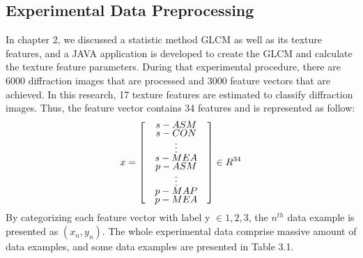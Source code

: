 \subsection{Experimental Data Preprocessing}
In chapter 2, we discussed a statistic method GLCM as well as its texture features, and a JAVA application is developed to create the GLCM and calculate the texture feature parameters. During that experimental procedure, there are 6000 diffraction images that are processed and 3000 feature vectors that are achieved. In this research, 17 texture features are estimated to classify diffraction images. Thus, the feature vector contains 34 features and is represented as follow:
\begin{align*}
x = 
\renewcommand{\arraystretch}{0.5}
\begin{bmatrix}
    & s-ASM & \\
    & s-CON & \\
    & \vdots & \\
    & s-MEA & \\
    & p-ASM & \\
    & \vdots & \\
    & p-MAP & \\
    & p-MEA & 
\end{bmatrix}
\in R^{34}
\end{align*}
By categorizing each feature vector with label y $\in {1,2,3}$, the $n^{th}$ data example is presented as $(x_n,y_n)$. The whole experimental data comprise massive amount of data examples, and some data examples are presented in Table 3.1.

